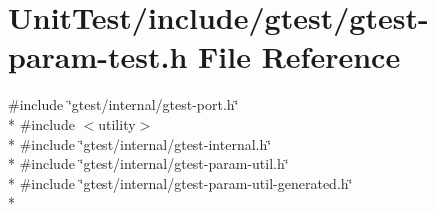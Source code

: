 \hypertarget{gtest-param-test_8h}{\section{Unit\+Test/include/gtest/gtest-\/param-\/test.h File Reference}
\label{gtest-param-test_8h}
}
{\ttfamily \#include \char`\"{}gtest/internal/gtest-\/port.\+h\char`\"{}}\\*
{\ttfamily \#include $<$utility$>$}\\*
{\ttfamily \#include \char`\"{}gtest/internal/gtest-\/internal.\+h\char`\"{}}\\*
{\ttfamily \#include \char`\"{}gtest/internal/gtest-\/param-\/util.\+h\char`\"{}}\\*
{\ttfamily \#include \char`\"{}gtest/internal/gtest-\/param-\/util-\/generated.\+h\char`\"{}}\\*
